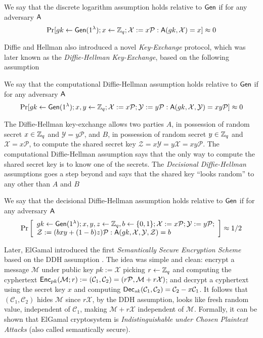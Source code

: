 \begin{definition}
We say that the discrete logarithm assumption holds relative to $\mathsf{Gen}$ if for any adversary $\mathsf{A}$
$$
\Pr[gk\gets\mathsf{Gen}(1^\lambda); x\gets\mathbb{Z}_q; \mathcal{X}:=x\mathcal{P}:\mathsf{A}(gk,\mathcal{X})=x]\approx 0
$$
\end{definition}
 
Diffie and Hellman also introduced a novel \emph{Key-Exchange} protocol, which was later known as the \emph{Diffie-Hellman Key-Exchange}, based on the following assumption

\begin{definition}
We say that the computational Diffie-Hellman assumption holds relative to $\mathsf{Gen}$ if for any adversary $\mathsf{A}$
$$
\Pr[gk\gets\mathsf{Gen}(1^\lambda); x,y\gets\mathbb{Z}_q; \mathcal{X}:=x\mathcal{P};\mathcal{Y}:=y\mathcal{P}:\mathsf{A}(gk,\mathcal{X},\mathcal{Y})=xy\mathcal{P}]\approx 0
$$
\end{definition}

The Diffie-Hellman key-exchange allows two parties $A$, in possession of random secret $x\in\mathbb{Z}_q$ and $\mathcal{Y}=y\mathcal{P}$, and $B$, in possession of random secret $y\in\mathbb{Z}_q$ and $\mathcal{X}=x\mathcal{P}$, to compute the shared secret key $\mathcal{Z}=x\mathcal{Y}=y\mathcal{X}=xy\mathcal{P}$. The computational Diffie-Hellman assumption says that the only way to compute the shared secret key is to know one of the secrets. The \emph{Decisional Diffie-Hellman} assumptions goes a step beyond and says that the shared key ``looks random'' to any other than $A$ and $B$

\begin{definition}
We say that the decisional Diffie-Hellman assumption holds relative to $\mathsf{Gen}$ if for any adversary $\mathsf{A}$
$$
\Pr\left[\begin{array}{l}
gk\gets\mathsf{Gen}(1^\lambda); x,y,z\gets\mathbb{Z}_q,b\gets\{0,1\};\mathcal{X}:=x\mathcal{P};\mathcal{Y}:=y\mathcal{P};\\
\mathcal{Z}:=(bxy+(1-b)z)\mathcal{P}:\mathsf{A}(gk,\mathcal{X},\mathcal{Y},\mathcal{Z})=b
\end{array}\right]\approx 1/2
$$
\end{definition}

Later, ElGamal introduced the first \emph{Semantically Secure Encryption Scheme} based on the DDH assumption \cite{ElGamal85}. The idea was simple and clean: encrypt a message $\mathcal{M}$ under public key $pk:=\mathcal{X}$ picking $r\gets\mathbb{Z}_q$ and computing the cyphertext $\mathsf{Enc}_{pk}(\mathcal{M};r):=(\mathcal{C}_1,\mathcal{C}_2)=(r\mathcal{P},\mathcal{M}+r\mathcal{X})$; and decrypt a cyphertext using the secret key $x$ and computing $\mathsf{Dec}_{sk}(\mathcal{C}_1,\mathcal{C}_2)=\mathcal{C}_2-x\mathcal{C}_1$. It follows that $(\mathcal{C}_1,\mathcal{C}_2)$ hides $\mathcal{M}$ since $r\mathcal{X}$, by the DDH assumption, looks like fresh random value, independent of $\mathcal{C}_1$, making $\mathcal{M}+r\mathcal{X}$ independent of $\mathcal{M}$. Formally, it can be shown that ElGamal cryptosystem is \emph{Indistinguishable under Chosen Plaintext Attacks} (also called semantically secure).

